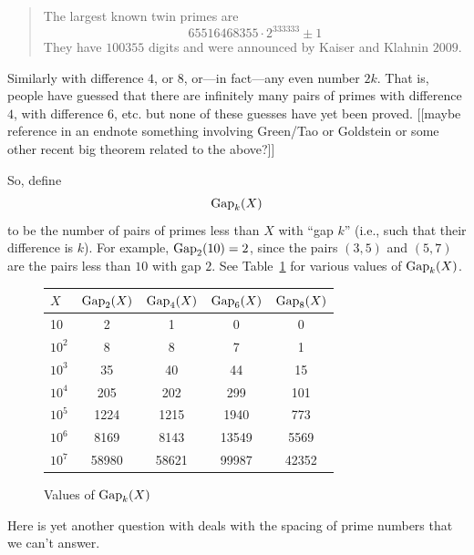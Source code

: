 \documentclass[11pt,draft]{article}
\theoremstyle{plain}
\theoremstyle{definition}
\numberwithin{equation}{section}
\numberwithin{figure}{section}
\numberwithin{table}{section}
\begin{document}
\begin{quote} The largest known twin primes are 
$$65516468355\cdot 2^{333333} \pm 1$$
They have $100355$ digits and were announced by Kaiser and Klahnin
$2009$.
\end{quote}


Similarly with difference $4$, or $8$, or---in fact---any even number
$2k$. That is, people have guessed that there are infinitely many
pairs of primes with difference $4$, with difference $6$, etc. but
none of these guesses have yet been proved. [[maybe reference in an
endnote something involving Green/Tao or Goldstein or some other
recent big theorem related to the above?]]




   
So, define $${\rm Gap}_{k}(X)$$ to be the number of pairs of primes
less than $X$ with ``gap $k$'' (i.e., such that their difference is
$k$).  For example, ${\rm Gap}_2(10) = 2$, since the pairs $(3,5)$ and
$(5,7)$ are the pairs less than $10$ with gap $2$.
See Table~\ref{tab:gap} for various values of ${\rm Gap}_{k}(X)$.
   
   \bigskip
   
\begin{figure}[H]
\begin{center}
\caption{Values of ${\rm Gap}_{k}(X)$ \label{tab:gap}}
\vspace{1em}

\begin{tabular}{|l|c|c|c|c|}\hline
$X$ & ${\rm Gap}_{2}(X)$ & ${\rm Gap}_{4}(X)$& ${\rm Gap}_{6}(X)$ & ${\rm Gap}_{8}(X)$\\\hline
10 & 2 & 1 & 0 & 0\\\hline
$10^2$ & 8 & 8 & 7 & 1 \\\hline
$10^3$ & 35 & 40 & 44 & 15 \\\hline
$10^4$ & 205 & 202 & 299 & 101 \\\hline
$10^5$ & 1224 & 1215 & 1940 & 773 \\\hline
$10^6$ & 8169 & 8143 & 13549 & 5569 \\\hline
$10^7$ & 58980 & 58621 & 99987 & 42352 \\\hline
\end{tabular}
\end{center}
\end{figure}   

   \bigskip
   
   Here is yet another question with deals with
the spacing of prime numbers that we can't answer.
  
\end{document}

